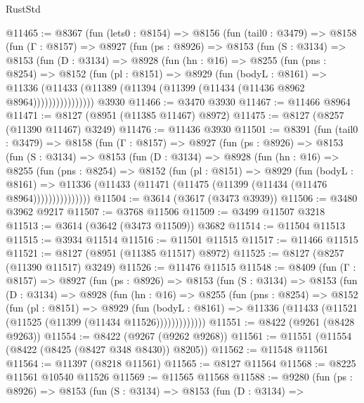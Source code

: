 \begin{lexlean}{RustStd}
\begin{coremodule}
@11465 := @8367
    (fun (lets0 : @8154) =>
    @8156
      (fun (tail0 : @3479) =>
      @8158
        (fun (Γ : @8157) =>
        @8927
          (fun (ps : @8926) =>
          @8153
            (fun (S : @3134) =>
            @8153
              (fun (D : @3134) =>
              @8928
                (fun (hn : @16) =>
                @8255
                  (fun (pns : @8254) =>
                  @8152
                    (fun (pl : @8151) =>
                    @8929
                      (fun (bodyL : @8161) =>
                      @11336
                        (@11433 (@11389 (@11394 (@11399 (@11434 (@11436 @8962 @8964))))))))))))))))
    @3930
@11466 := @3470 @3930
@11467 := @11466 @8964
@11471 := @8127 (@8951 (@11385 @11467) @8972)
@11475 := @8127 (@8257 (@11390 @11467) @3249)
@11476 := @11436 @3930
@11501 := @8391
    (fun (tail0 : @3479) =>
    @8158
      (fun (Γ : @8157) =>
      @8927
        (fun (ps : @8926) =>
        @8153
          (fun (S : @3134) =>
          @8153
            (fun (D : @3134) =>
            @8928
              (fun (hn : @16) =>
              @8255
                (fun (pns : @8254) =>
                @8152
                  (fun (pl : @8151) =>
                  @8929
                    (fun (bodyL : @8161) =>
                    @11336 (@11433 (@11471 (@11475 (@11399 (@11434 (@11476 @8964)))))))))))))))
@11504 := @3614 (@3617 (@3473 @3939))
@11506 := @3480 @3962 @9217
@11507 := @3768 @11506
@11509 := @3499 @11507 @3218
@11513 := @3614 (@3642 (@3473 @11509)) @3682
@11514 := @11504 @11513
@11515 := @3934 @11514
@11516 := @11501 @11515
@11517 := @11466 @11515
@11521 := @8127 (@8951 (@11385 @11517) @8972)
@11525 := @8127 (@8257 (@11390 @11517) @3249)
@11526 := @11476 @11515
@11548 := @8409
    (fun (Γ : @8157) =>
    @8927
      (fun (ps : @8926) =>
      @8153
        (fun (S : @3134) =>
        @8153
          (fun (D : @3134) =>
          @8928
            (fun (hn : @16) =>
            @8255
              (fun (pns : @8254) =>
              @8152
                (fun (pl : @8151) =>
                @8929
                  (fun (bodyL : @8161) =>
                  @11336 (@11433 (@11521 (@11525 (@11399 (@11434 @11526)))))))))))))
@11551 := @8422 (@9261 (@8428 @9263))
@11554 := @8422 (@9267 (@9262 @9268))
@11561 := @11551 (@11554 (@8422 (@8425 (@8427 @348 @8430)) @8205))
@11562 := @11548 @11561
@11564 := @11397 (@8218 @11561)
@11565 := @8127 @11564
@11568 := @8225 @11561 @10540 @11526
@11569 := @11565 @11568
@11588 := @9280
    (fun (ps : @8926) =>
    @8153
      (fun (S : @3134) =>
      @8153
        (fun (D : @3134) =>

\end{coremodule}
\end{lexlean}

